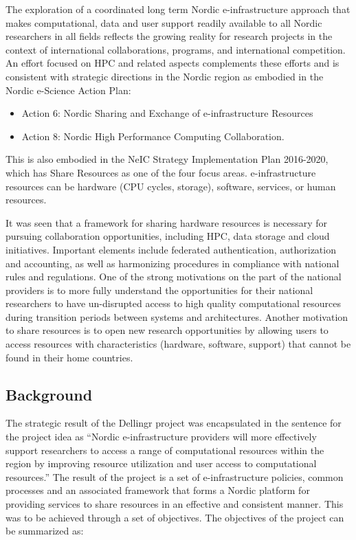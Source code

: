 \documentclass{article}
\newcommand{\dell}{Dellingr\xspace}
\newcommand{\einfra}{e-infrastructure\xspace}
\begin{document}
The exploration of a coordinated long term Nordic \einfra approach that makes computational, data and user support readily available to all Nordic researchers in all fields reflects the growing reality for research projects in the context of international collaborations, programs, and international competition.
An effort focused on HPC and related aspects complements these efforts and is consistent with strategic directions in the Nordic region as embodied in the Nordic e-Science Action Plan:
\begin{itemize}
\item Action 6: Nordic Sharing and Exchange of \einfra Resources
\item Action 8: Nordic High Performance Computing Collaboration.
\end{itemize}

This is also embodied in the NeIC Strategy Implementation Plan 2016-2020, which has Share Resources as one of the four focus areas.
\einfra resources can be hardware (CPU cycles, storage), software, services, or human resources. 

It was seen that a framework for sharing hardware resources is necessary for pursuing collaboration opportunities, including HPC, data storage and cloud initiatives. 
Important elements include federated authentication, authorization and accounting, as well as harmonizing procedures in compliance with national rules and regulations. 
One of the strong motivations on the part of the national providers is to more fully understand the opportunities for their national researchers to have un-disrupted access to high quality computational resources during transition periods between systems and architectures. 
Another motivation to share resources is to open new research opportunities by allowing users to access resources with characteristics (hardware, software, support) that cannot be found in their home countries.


\subsection{Background}
\label{ssec:background}

The strategic result of the \dell project was encapsulated 
in the sentence for the project idea as ``Nordic \einfra providers will more effectively support researchers to access a range of computational
resources within the region by improving resource utilization and user access to computational resources.''
The result of the project is a set of \einfra policies, common processes and an associated framework that forms a Nordic platform for providing services to share resources in an effective and consistent manner.
This was to be achieved through a set of objectives.
The objectives of the project can be summarized as: \\
\end{document}
